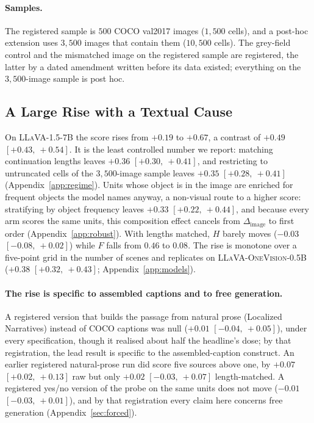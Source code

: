 \documentclass{article} %
\newcommand{\dSight}{\ensuremath{\Delta_{\mathrm{image}}}}
\newcommand{\civ}[2]{$[#1,\ #2]$}
\begin{document}
\paragraph{Samples.} The registered sample is $500$ COCO val2017 images ($1{,}500$ cells), and a
post-hoc extension uses $3{,}500$ images that contain them ($10{,}500$ cells). The grey-field control
and the mismatched image on the registered sample are registered, the latter by a dated amendment
written before its data existed; everything on the $3{,}500$-image sample is post hoc.

\subsection{A Large Rise with a Textual Cause}
\label{sec:exp1}

On \textsc{LLaVA-1.5-7B} the score rises from $+0.19$ to $+0.67$, a contrast of $+0.49$
\civ{+0.43}{+0.54}. It is the least controlled number we report: matching continuation lengths leaves
$+0.36$ \civ{+0.30}{+0.41}, and restricting to untruncated cells of the $3{,}500$-image sample leaves
$+0.35$ \civ{+0.28}{+0.41} (Appendix~\ref{app:regime}). Units whose object is in the image are enriched
for frequent objects the model names anyway, a non-visual route to a higher score: stratifying by
object frequency leaves $+0.33$ \civ{+0.22}{+0.44}, and because every arm scores the same units, this
composition effect cancels from $\dSight$ to first order (Appendix~\ref{app:robust}). With lengths
matched, $H$ barely moves ($-0.03$ \civ{-0.08}{+0.02}) while $F$ falls from $0.46$ to $0.08$. The rise
is monotone over a five-point grid in the number of scenes and replicates on
\textsc{LLaVA-OneVision-0.5B} ($+0.38$ \civ{+0.32}{+0.43}; Appendix~\ref{app:models}).

\paragraph{The rise is specific to assembled captions and to free generation.} A registered version
that builds the passage from natural prose (Localized Narratives) instead of COCO captions was null
($+0.01$ \civ{-0.04}{+0.05}), under every specification, though it realised about half the headline's
dose; by that registration, the lead result is specific to the assembled-caption construct. An earlier
registered natural-prose run did score five sources above one, by $+0.07$ \civ{+0.02}{+0.13} raw but
only $+0.02$ \civ{-0.03}{+0.07} length-matched. A registered yes/no version of the probe on the same
units does not move ($-0.01$ \civ{-0.03}{+0.01}), and by that registration every claim here concerns
free generation (Appendix~\ref{sec:forced}).
\end{document}
